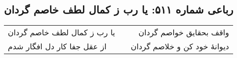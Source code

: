 \begin{center}
\section*{رباعی شماره ۵۱۱: یا رب ز کمال لطف خاصم گردان}
\label{sec:sh511}
\begin{longtable}{l p{0.5cm} r}
یا رب ز کمال لطف خاصم گردان
&&
واقف بحقایق خواصم گردان
\\
از عقل جفا کار دل افگار شدم
&&
دیوانهٔ خود کن و خلاصم گردان
\\
\end{longtable}
\end{center}
